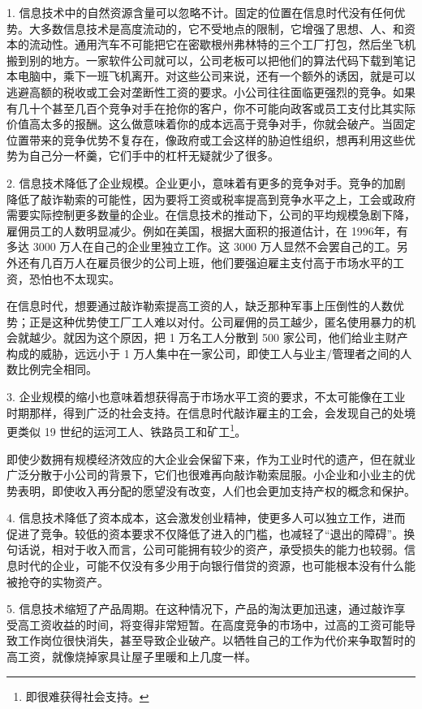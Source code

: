 1. 信息技术中的自然资源含量可以忽略不计。固定的位置在信息时代没有任何优势。大多数信息技术是高度流动的，它不受地点的限制，它增强了思想、人、和资本的流动性。通用汽车不可能把它在密歇根州弗林特的三个工厂打包，然后坐飞机搬到别的地方。一家软件公司就可以，公司老板可以把他们的算法代码下载到笔记本电脑中，乘下一班飞机离开。对这些公司来说，还有一个额外的诱因，就是可以逃避高额的税收或工会对垄断性工资的要求。小公司往往面临更强烈的竞争。如果有几十个甚至几百个竞争对手在抢你的客户，你不可能向政客或员工支付比其实际价值高太多的报酬。这么做意味着你的成本远高于竞争对手，你就会破产。当固定位置带来的竞争优势不复存在，像政府或工会这样的胁迫性组织，想再利用这些优势为自己分一杯羹，它们手中的杠杆无疑就少了很多。

2. 信息技术降低了企业规模。企业更小，意味着有更多的竞争对手。竞争的加剧降低了敲诈勒索的可能性，因为要将工资或税率提高到竞争水平之上，工会或政府需要实际控制更多数量的企业。在信息技术的推动下，公司的平均规模急剧下降，雇佣员工的人数明显减少。例如在美国，根据大面积的报道估计，在 1996年，有多达 3000 万人在自己的企业里独立工作。这 3000 万人显然不会罢自己的工。另外还有几百万人在雇员很少的公司上班，他们要强迫雇主支付高于市场水平的工资，恐怕也不太现实。

在信息时代，想要通过敲诈勒索提高工资的人，缺乏那种军事上压倒性的人数优势；正是这种优势使工厂工人难以对付。公司雇佣的员工越少，匿名使用暴力的机会就越少。就因为这个原因，把 1 万名工人分散到 500 家公司，他们给业主财产构成的威胁，远远小于 1 万人集中在一家公司，即使工人与业主/管理者之间的人数比例完全相同。

3. 企业规模的缩小也意味着想获得高于市场水平工资的要求，不太可能像在工业时期那样，得到广泛的社会支持。在信息时代敲诈雇主的工会，会发现自己的处境更类似 19 世纪的运河工人、铁路员工和矿工\footnote{即很难获得社会支持。}。

即使少数拥有规模经济效应的大企业会保留下来，作为工业时代的遗产，但在就业广泛分散于小公司的背景下，它们也很难再向敲诈勒索屈服。小企业和小业主的优势表明，即使收入再分配的愿望没有改变，人们也会更加支持产权的概念和保护。

4. 信息技术降低了资本成本，这会激发创业精神，使更多人可以独立工作，进而促进了竞争。较低的资本要求不仅降低了进入的门槛，也减轻了“退出的障碍”。换句话说，相对于收入而言，公司可能拥有较少的资产，承受损失的能力也较弱。信息时代的企业，可能不仅没有多少用于向银行借贷的资源，也可能根本没有什么能被抢夺的实物资产。

5. 信息技术缩短了产品周期。在这种情况下，产品的淘汰更加迅速，通过敲诈享受高工资收益的时间，将变得非常短暂。在高度竞争的市场中，过高的工资可能导致工作岗位很快消失，甚至导致企业破产。以牺牲自己的工作为代价来争取暂时的高工资，就像烧掉家具让屋子里暖和上几度一样。

